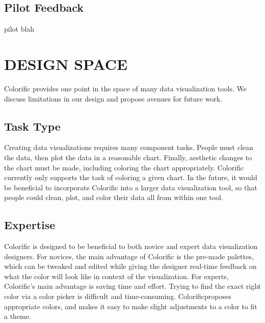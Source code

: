 \documentclass{article}
\newcommand\system{Colorific}
\begin{document}

\subsection{Pilot Feedback}
pilot blah

\section{DESIGN SPACE}
Colorific provides one point in the space of many data visualization tools. We discuss limitations in our design and propose avenues for future work. 

\subsection{Task Type}
Creating data visualizations requires many component tasks. People must clean the data, then plot the data in a reasonable chart. Finally, aesthetic changes to the chart must be made, including coloring the chart appropriately. Colorific currently only supports the task of coloring a given chart. In the future, it would be beneficial to incorporate Colorific into a larger data visualization tool, so that people could clean, plot, and color their data all from within one tool. 

\subsection{Expertise}
Colorific is designed to be beneficial to both novice and expert data visualization designers. For novices, the main advantage of Colorific is the pre-made palettes, which can be tweaked and edited while giving the designer real-time feedback on what the color will look like in context of the visualization. For experts, Colorific's main advantage is saving time and effort. Trying to find the exact right color via a color picker is difficult and time-consuming. \system proposes appropriate colors, and makes it easy to make slight adjustments to a color to fit a theme. 
\end{document}
